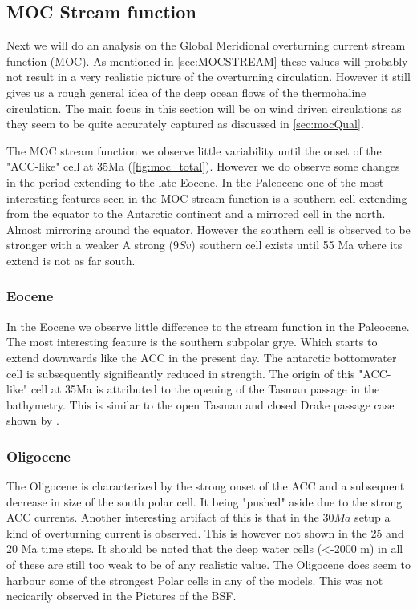 \subsection{MOC Stream function}

Next we will do an analysis on the Global Meridional overturning current stream function (MOC). As mentioned in \cref{sec:MOCSTREAM} these values will probably not result in a very realistic picture of the overturning circulation. However it still gives us a rough general idea of the deep ocean flows of the thermohaline circulation. The main focus in this section will be on wind driven circulations as they seem to be quite accurately captured as discussed in \cref{sec:mocQual}. 

The MOC stream function we observe little variability until the onset of the "ACC-like" cell at 35Ma (\cref{fig:moc_total}). However we do observe some changes in the period extending to the late Eocene. In the Paleocene one of the most interesting features seen in the MOC stream function is a southern cell extending from the equator to the Antarctic continent and a mirrored cell in the north. Almost mirroring around the equator. However the southern cell is observed to be stronger with a weaker  A strong ($9 Sv$) southern cell exists until 55 Ma where its extend is not as far south.

\subsubsection{Eocene}\label{sec:eocenemoc}
In the Eocene we observe little difference to the stream function in the Paleocene. The most interesting feature is the southern subpolar grye. Which starts to extend downwards like the ACC in the present day. The antarctic bottomwater cell is subsequently significantly reduced in strength.
The origin of this "ACC-like" cell at 35Ma is attributed to the opening of the Tasman passage in the bathymetry. This is similar to the open Tasman and closed Drake passage case shown by \cite{Sijp2011Dec}.  

\subsubsection{Oligocene}
The Oligocene is characterized by the strong onset of the ACC and a subsequent decrease in size of the south polar cell. It being "pushed" aside due to the strong ACC currents. Another interesting artifact of this is that in the $30 Ma$ setup a kind of overturning current is observed. This is however not shown in the 25 and 20 Ma time steps. It should be noted that the deep water cells (<-2000 m) in all of these are still too weak to be of any realistic value. The Oligocene does seem to harbour some of the strongest Polar cells in any of the models. This was not necicarily observed in the Pictures of the BSF.


